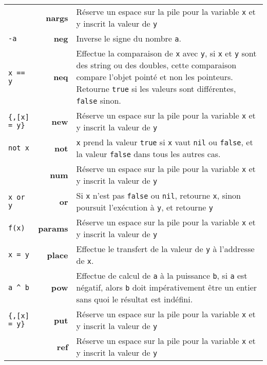 \documentclass{article}
\begin{document}
\begin{longtable}{p{1.3cm} r p{12cm}}
  {\lstset{style=lua}\lstinline$$} & \textbf{nargs} & Réserve un espace sur la pile pour la variable \texttt{x} et y inscrit la valeur de \texttt{y}\\
  {\lstinline$-a$} & \textbf{neg} & Inverse le signe du nombre \texttt{a}.\\
  {\lstinline$x == y$} & \textbf{neq} & Effectue la comparaison de \texttt{x} avec \texttt{y}, si \texttt{x} et \texttt{y} sont des string ou des doubles, cette comparaison compare l'objet pointé et non les pointeurs. Retourne {\lstset{style=lua}\lstinline$true$} si les valeurs sont différentes, {\lstset{style=lua}\lstinline$false$} sinon.\\
  {\lstset{style=lua}\lstinline${,[x] = y}$} & \textbf{new} & Réserve un espace sur la pile pour la variable \texttt{x} et y inscrit la valeur de \texttt{y}\\
  {\lstset{style=lua}\lstinline$not x$} & \textbf{not} & \texttt{x} prend la valeur {\lstset{style=lua}\lstinline$true$} si \texttt{x} vaut {\lstset{style=lua}\lstinline$nil$} ou {\lstset{style=lua}\lstinline$false$}, et la valeur {\lstset{style=lua}\lstinline$false$} dans tous les autres cas.\\
  {\lstset{style=lua}\lstinline$$} & \textbf{num} & Réserve un espace sur la pile pour la variable \texttt{x} et y inscrit la valeur de \texttt{y}\\
  {\lstinline$x or y$} & \textbf{or} & Si \texttt{x} n'est pas {\lstset{style=lua}\lstinline$false$} ou {\lstset{style=lua}\lstinline$nil$}, retourne \texttt{x}, sinon poursuit l'exécution à \texttt{y}, et retourne \texttt{y}\\
  {\lstset{style=lua}\lstinline$f(x)$} & \textbf{params} & Réserve un espace sur la pile pour la variable \texttt{x} et y inscrit la valeur de \texttt{y}\\
  {\lstinline$x = y$} & \textbf{place} & Effectue le transfert de la valeur de \texttt{y} à l'addresse de \texttt{x}.\\
  {\lstinline$a ^ b$} & \textbf{pow} & Effectue de calcul de \texttt{a} à la puissance \texttt{b}, si \texttt{a} est négatif, alors \texttt{b} doit impérativement être un entier sans quoi le résultat est indéfini.\\
  {\lstset{style=lua}\lstinline${,[x] = y}$} & \textbf{put} & Réserve un espace sur la pile pour la variable \texttt{x} et y inscrit la valeur de \texttt{y}\\
  {\lstset{style=lua}\lstinline$$} & \textbf{ref} & Réserve un espace sur la pile pour la variable \texttt{x} et y inscrit la valeur de \texttt{y}\\

\end{longtable}
\end{document}
